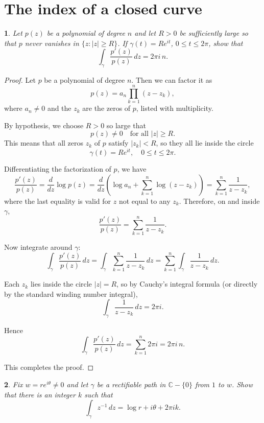 \documentclass[12pt, a4paper]{report}
\theoremstyle{spaced}
\newtheorem{exercise}{}
\newcommand{\setexercise}[1]{\setcounter{exercise}{#1-1}}
\begin{document}
\section{The index of a closed curve}
\setexercise{3}
\begin{exercise}
	Let $p(z)$ be a polynomial of degree $n$ and let $R>0$ be sufficiently large so that
	$p$ never vanishes in $\{z : |z| \ge R\}$.
	If $\gamma(t)=Re^{it}$, $0\le t\le 2\pi$, show that
	\[
		\int_{\gamma} \frac{p'(z)}{p(z)}\,dz = 2\pi i\,n.
	\]
\end{exercise}
\begin{proof}
	Let $p$ be a polynomial of degree $n$. Then we can factor it as
	\[
		p(z) = a_n \prod_{k=1}^n (z - z_k),
	\]
	where $a_n \neq 0$ and the $z_k$ are the zeros of $p$, listed with multiplicity.

	By hypothesis, we choose $R>0$ so large that
	\[
		p(z) \neq 0 \quad \text{for all } |z|\ge R.
	\]
	This means that all zeros $z_k$ of $p$ satisfy $|z_k| < R$, so they all lie inside the circle
	\[
		\gamma(t) = Re^{it}, \quad 0 \le t \le 2\pi.
	\]

	Differentiating the factorization of $p$, we have
	\[
		\frac{p'(z)}{p(z)}
		= \frac{d}{dz} \log p(z)
		= \frac{d}{dz} \left( \log a_n + \sum_{k=1}^n \log(z - z_k) \right)
		= \sum_{k=1}^n \frac{1}{z - z_k},
	\]
	where the last equality is valid for $z$ not equal to any $z_k$.
	Therefore, on and inside $\gamma$,
	\[
		\frac{p'(z)}{p(z)} = \sum_{k=1}^n \frac{1}{z - z_k}.
	\]

	Now integrate around $\gamma$:
	\[
		\int_{\gamma} \frac{p'(z)}{p(z)}\,dz
		= \int_{\gamma} \sum_{k=1}^n \frac{1}{z - z_k}\,dz
		= \sum_{k=1}^n \int_{\gamma} \frac{1}{z - z_k}\,dz.
	\]

	Each $z_k$ lies inside the circle $|z|=R$, so by Cauchy's integral formula (or directly by the standard winding number integral),
	\[
		\int_{\gamma} \frac{1}{z - z_k}\,dz = 2\pi i.
	\]

	Hence
	\[
		\int_{\gamma} \frac{p'(z)}{p(z)}\,dz
		= \sum_{k=1}^n 2\pi i
		= 2\pi i\, n.
	\]

	This completes the proof.
\end{proof}

\setexercise{4}
\begin{exercise}
	Fix $w = r e^{i\theta} \ne 0$ and let $\gamma$ be a rectifiable path in $\mathbb{C}-\{0\}$ from $1$ to $w$.
	Show that there is an integer $k$ such that
	\[
		\int_{\gamma} z^{-1}\,dz = \log r + i\theta + 2\pi i k.
	\]
\end{exercise}
\end{document}
